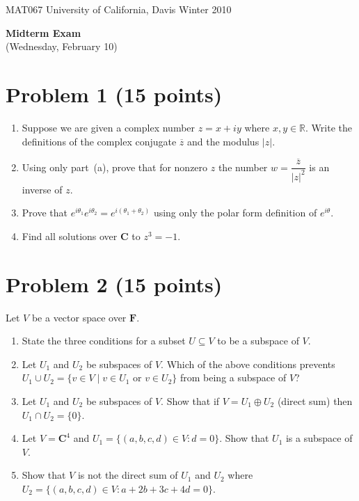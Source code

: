 \documentclass[11pt]{article}
\begin{document}
\begin{center}
MAT067 \quad University of California, Davis \quad Winter 2010

\Large\textbf{Midterm Exam}\\[4pt]
\normalsize (Wednesday, February 10)
\end{center}

\small
\section*{Problem 1 (15 points)}
\begin{enumerate}[label=\alph*)]
  \item Suppose we are given a complex number $z = x + iy$ where $x, y \in \mathbb{R}$. Write the definitions of the complex conjugate $\overline{z}$ and the modulus $|z|$.
  \item Using only part~(a), prove that for nonzero $z$ the number $w = \dfrac{\overline{z}}{|z|^{2}}$ is an inverse of $z$.
  \item Prove that $e^{i\theta_{1}} e^{i\theta_{2}} = e^{i(\theta_{1} + \theta_{2})}$ using only the polar form definition of $e^{i\theta}$.
  \item Find all solutions over $\mathbf{C}$ to $z^{3} = -1$.
\end{enumerate}

\section*{Problem 2 (15 points)}
Let $V$ be a vector space over $\mathbf{F}$.
\begin{enumerate}[label=\alph*)]
  \item State the three conditions for a subset $U \subseteq V$ to be a subspace of $V$.
  \item Let $U_{1}$ and $U_{2}$ be subspaces of $V$. Which of the above conditions prevents $U_{1} \cup U_{2} = \{v \in V \mid v \in U_{1} \text{ or } v \in U_{2}\}$ from being a subspace of $V$?
  \item Let $U_{1}$ and $U_{2}$ be subspaces of $V$. Show that if $V = U_{1} \oplus U_{2}$ (direct sum) then $U_{1} \cap U_{2} = \{0\}$.
  \item Let $V = \mathbf{C}^{4}$ and $U_{1} = \{(a,b,c,d) \in V : d = 0\}$. Show that $U_{1}$ is a subspace of $V$.
  \item Show that $V$ is not the direct sum of $U_{1}$ and $U_{2}$ where $U_{2} = \{(a,b,c,d) \in V : a + 2b + 3c + 4d = 0\}$.
\end{enumerate}
\end{document}
